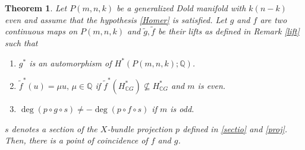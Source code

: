 \documentclass{amsart}
\newtheorem{theorem}{Theorem}[section]
\begin{document}
\begin{theorem}\label{coincidence thm under hom}
	Let $P(m,n,k)$ be a generalized Dold manifold with $k(n-k)$ even and assume that the hypothesis \eqref{Homer} is satisfied. Let $g$ and $f$ are two continuous maps on $P(m,n,k)$ and $\tilde g, \tilde f$ be their lifts as defined in  Remark \ref{lift} such %
that
	\begin{enumerate}	
		\item $g^*$ is an automorphism of $H^*(P(m,n,k);\mathbb Q)$. 
		\item $\tilde{f}^*(u) = \mu u,\, \mu \in \mathbb{Q}$ if $\tilde{f}^*(H^*_{\mathbb CG}) \nsubseteq H^*_{\mathbb CG}$ and $m$ is even.
		\item $\deg(p\circ g \circ s)\neq -\deg (p\circ f\circ s)$ %
if $m$ is odd.
	\end{enumerate}
	$s$ denotes a section of the $X$-bundle projection $p$ defined in \eqref{sectio} and \eqref{proj}. Then, there is a point of coincidence of $f$ and  $g$.
\end{theorem}
\end{document}
